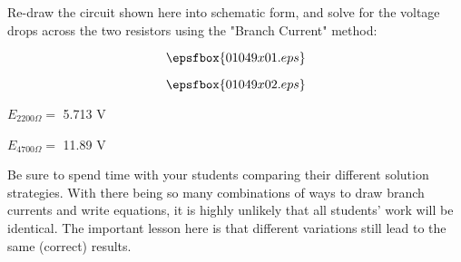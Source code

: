 

Re-draw the circuit shown here into schematic form, and solve for the voltage drops across the two resistors using the "Branch Current" method:

$$\epsfbox{01049x01.eps}$$







$$\epsfbox{01049x02.eps}$$

$E_{2200 \Omega} =$ 5.713 V

\vskip 10pt

$E_{4700 \Omega} =$ 11.89 V







Be sure to spend time with your students comparing their different solution strategies.  With there being so many combinations of ways to draw branch currents and write equations, it is highly unlikely that all students' work will be identical.  The important lesson here is that different variations still lead to the same (correct) results.



